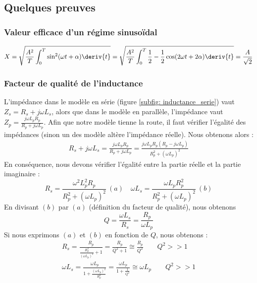 \documentclass[12pt,a4paper]{article}
\begin{document}
\subsection{Quelques preuves}
\label{app: preuves}
\subsubsection{Valeur efficace d'un régime sinusoïdal}
\label{app: preuve valeur efficace}
\begin{equation}
	X = \sqrt{\frac{A^2}{T} \int_0^T \sin^2(\omega t + \alpha) \deriv{t}} = \sqrt{\frac{A^2}{T}\int_0^T \frac{1}{2} - \frac{1}{2}\cos(2\omega t + 2\alpha)\deriv{t}} = \frac{A}{\sqrt{2}}
\end{equation}
\subsubsection{Facteur de qualité de l'inductance}
\label{app: preuve facteur qualite inductance}
L'impédance dans le modèle en série (figure \ref{subfig: inductance_serie}) vaut $Z_s = R_s + j\omega L_s$, alors que dans le modèle en parallèle, l'impédance vaut $Z_p = \frac{j\omega L_p R_p}{R_p + j\omega L_p}$. Afin que notre modèle tienne la route, il faut vérifier l'égalité des impédances (sinon un des modèle altère l'impédance réelle). Nous obtenons alors :
\begin{align*}
	R_s + j\omega L_s = \frac{j\omega L_p R_p}{R_p + j\omega L_p} = \frac{j\omega L_p R_p(R_p - j\omega L_p)}{R_p^2 + (\omega L_p)^2}
\end{align*}
En conséquence, nous devons vérifier l'égalité entre la partie réelle et la partie imaginaire :
\begin{equation*}
	R_s = \frac{\omega^2 L_p^2 R_p}{R_p^2 + (\omega L_p)^2}\ (a) \quad \omega L_s = \frac{\omega L_p R_p^2}{R_p^2 + (\omega L_p)^2} \ (b)
\end{equation*}
En divisant $(b)$ par $(a)$ (définition du facteur de qualité), nous obtenons 
\[Q = \frac{\omega L_s}{R_s} = \frac{R_p}{\omega L_p}\]
Si nous exprimons $(a)$ et $(b)$ en fonction de $Q$, nous obtenons :
\begin{align*}
	R_s = \frac{R_p}{\frac{R_p^2}{(\omega L_p)^2} + 1} = \frac{R_p}{Q^2 + 1} \cong \frac{R_p}{Q^2} \qquad Q^2 >> 1\\
	\omega L_s = \frac{\omega L_p}{1 + \frac{(\omega L_p)^2}{R_p^2}} = \frac{\omega L_p}{1+\frac{1}{Q^2}} \cong \omega L_p \qquad Q^2 >> 1
\end{align*}
\end{document}
